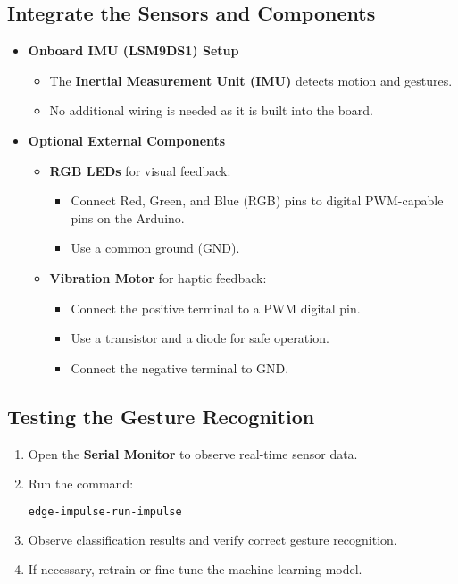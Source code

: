 \subsection{Integrate the Sensors and Components}
\begin{itemize}
	\item \textbf{Onboard IMU (LSM9DS1) Setup}
	\begin{itemize}
		\item The \textbf{Inertial Measurement Unit (IMU)} detects motion and gestures.
		\item No additional wiring is needed as it is built into the board.
	\end{itemize}
	\item \textbf{Optional External Components}
	\begin{itemize}
		\item \textbf{RGB LEDs} for visual feedback:
		\begin{itemize}
			\item Connect Red, Green, and Blue (RGB) pins to digital PWM-capable pins on the Arduino.
			\item Use a common ground (GND).
		\end{itemize}
		\item \textbf{Vibration Motor} for haptic feedback:
		\begin{itemize}
			\item Connect the positive terminal to a PWM digital pin.
			\item Use a transistor and a diode for safe operation.
			\item Connect the negative terminal to GND.
		\end{itemize}
	\end{itemize}
\end{itemize}

\subsection{Testing the Gesture Recognition}
\begin{enumerate}
	\item Open the \textbf{Serial Monitor} to observe real-time sensor data.
	\item Run the command:
	\begin{lstlisting}[language=sh]
		edge-impulse-run-impulse
	\end{lstlisting}
	\item Observe classification results and verify correct gesture recognition.
	\item If necessary, retrain or fine-tune the machine learning model.
\end{enumerate}

